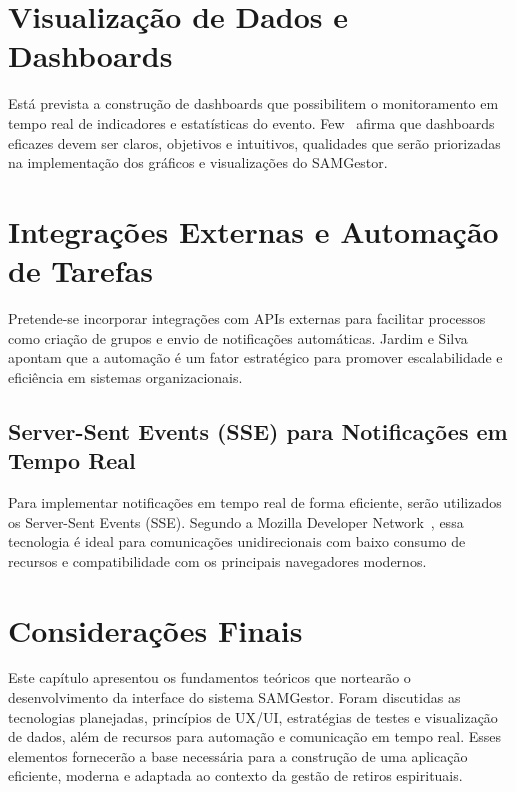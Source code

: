 \section{Visualização de Dados e Dashboards}

Está prevista a construção de dashboards que possibilitem o monitoramento em tempo real de indicadores e estatísticas do evento. Few~\cite{few2013} afirma que dashboards eficazes devem ser claros, objetivos e intuitivos, qualidades que serão priorizadas na implementação dos gráficos e visualizações do SAMGestor.

\section{Integrações Externas e Automação de Tarefas}

Pretende-se incorporar integrações com APIs externas para facilitar processos como criação de grupos e envio de notificações automáticas. Jardim e Silva~\cite{jardim2021} apontam que a automação é um fator estratégico para promover escalabilidade e eficiência em sistemas organizacionais.

\subsection{Server-Sent Events (SSE) para Notificações em Tempo Real}

Para implementar notificações em tempo real de forma eficiente, serão utilizados os Server-Sent Events (SSE). Segundo a Mozilla Developer Network~\cite{mdn2025}, essa tecnologia é ideal para comunicações unidirecionais com baixo consumo de recursos e compatibilidade com os principais navegadores modernos.

\section{Considerações Finais}

Este capítulo apresentou os fundamentos teóricos que nortearão o desenvolvimento da interface do sistema SAMGestor. Foram discutidas as tecnologias planejadas, princípios de UX/UI, estratégias de testes e visualização de dados, além de recursos para automação e comunicação em tempo real. Esses elementos fornecerão a base necessária para a construção de uma aplicação eficiente, moderna e adaptada ao contexto da gestão de retiros espirituais.



% 
%